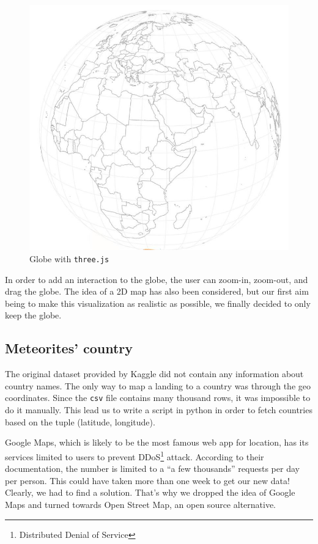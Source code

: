 \documentclass[10pt,conference,compsocconf]{IEEEtran}
\begin{document}
\begin{figure}[H]
  \centering
  \includegraphics[width=\columnwidth]{images/globe.jpg}
  \vspace{-3mm}
  \caption{Globe with \texttt{three.js}}
  \label{fig:globe}
\end{figure}

In order to add an interaction to the globe, the user can zoom-in, zoom-out, and drag the globe. 
The idea of a 2D map has also been considered, but our first aim being to make this visualization as realistic as possible, we finally decided to only keep the globe.

\subsection{Meteorites' country}

The original dataset provided by Kaggle did not contain any information about country names. The only way to map a landing to a country was through the geo coordinates. Since the \texttt{csv} file contains many thousand rows, it was impossible to do it manually. This lead us to write a script in python in order to fetch countries based on the tuple (latitude, longitude).

Google Maps, which is likely to be the most famous web app for location, has its services limited to users to prevent DDoS\footnote{Distributed Denial of Service} attack. According to their documentation, the number is limited to a ``a few thousands'' requests per day per person. This could have taken more than one week to get our new data! Clearly, we had to find a solution. That's why we dropped the idea of Google Maps and turned towards Open Street Map, an open source alternative.
\end{document}
